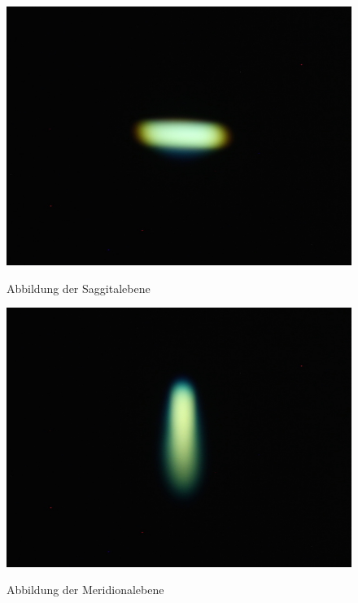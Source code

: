 \begin{figure}[htb]
	\begin{minipage}[t]{0.48\textwidth}
		\includegraphics[width=\linewidth]{img/Astigmatismus/Prakt_Linsenfehler_2015_06_04_087_saggital}
		\label{fig:astigmatismus_saggital}
		\caption{Abbildung der Saggitalebene}
	\end{minipage}
	\hfill
	\begin{minipage}[t]{0.48\textwidth}
		\includegraphics[width=\linewidth]{img/Astigmatismus/Prakt_Linsenfehler_2015_06_04_088_meridional}
		\label{fig:astigmatismus_meridional}
		\caption{Abbildung der Meridionalebene}
	\end{minipage}
	
	\vspace{0.5cm}
	

\end{figure}
